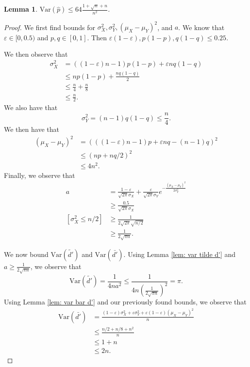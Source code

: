 \documentclass[10pt,onecolumn,letterpaper]{article}
\newtheorem{lem}[thm]{Lemma}
\newcommand{\Var}{\mathrm{Var}}
\newcommand{\eps}{\varepsilon}
\begin{document}
\begin{lem} \label{lem: var p_hat}
$\Var(\hat p) \leq 64\frac{1 + \sqrt{n} + n}{n^2}$.
\end{lem}
\begin{proof}
We first find bounds for $\sigma_X^2, \sigma_Y^2, (\mu_X - \mu_Y)^2$, and $a$. We know that $\eps\in[0, 0.5)$ and $p,q\in[0,1]$. Then $\eps(1-\eps), p(1-p), q(1-q) \leq 0.25$.

We then observe that \begin{align*}
    \sigma_X^2 &= ((1-\eps)n-1)p(1-p) + \eps nq(1-q) \\
    &\leq np(1-p) + \frac{nq(1-q)}{2}\\
    &\leq \frac{n}{4} + \frac{n}{8}\\
    &\leq \frac{n}{2}.
\end{align*} We also have that $$\sigma_Y^2 = (n-1)q(1-q)\leq \frac{n}{4}.$$ We then have that \begin{align*}
    (\mu_X - \mu_Y)^2 &= (((1-\eps)n-1)p + \eps nq - (n-1)q)^2\\
    &\leq (np + nq/2)^2\\
    &\leq 4n^2.
\end{align*} Finally, we observe that \begin{align*}
    a &= \frac{1-\eps}{\sqrt{2\pi}\sigma_X} + \frac{\eps}{\sqrt{2\pi}\sigma_Y}e^{-\frac{(\mu_X-\mu_Y)^2}{2\sigma_Y^2}}\\
    &\geq \frac{0.5}{\sqrt{2\pi}\sigma_X}\\
    [\sigma_X^2\leq n/2]&\geq \frac{1}{2\sqrt{2\pi}\sqrt{n/2}}\\
    &\geq \frac{1}{2\sqrt{\pi n}}.
\end{align*}

We now bound $\Var(\tilde{d'})$ and $\Var(\bar{d'})$. Using Lemma \ref{lem: var tilde d'} and $a\geq \frac{1}{2\sqrt{\pi n}}$, we observe that $$\Var(\tilde{d'}) = \frac{1}{4na^2} \leq \frac{1}{4n\left(\frac{1}{2\sqrt{\pi n}}\right)^2} = \pi.$$ Using Lemma \ref{lem: var bar d'} and our previously found bounds, we observe that \begin{align*}
    \Var(\bar{d'}) &= \frac{(1-\eps)\sigma_X^2 + \eps\sigma_Y^2 + \eps(1-\eps)(\mu_X-\mu_Y)^2}{n}\\
    &\leq \frac{n/2 + n/8 + n^2}{n}\\
    &\leq 1 + n\\
    &\leq 2n.
\end{align*}


\end{proof}
\end{document}
